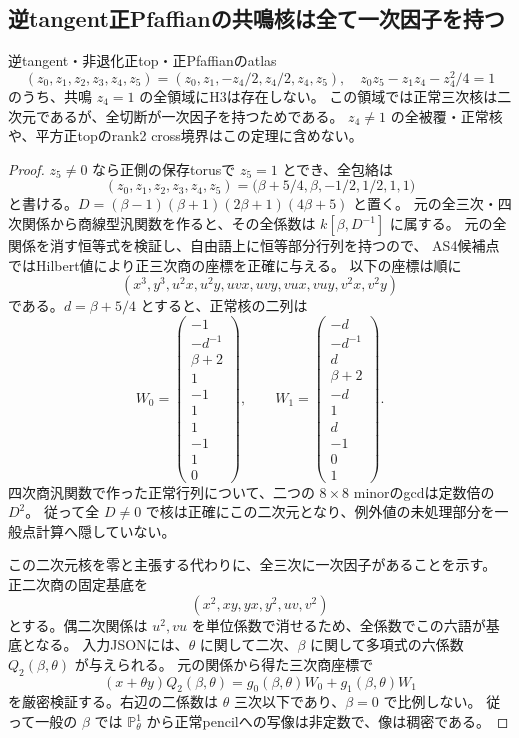 \subsection{逆tangent正Pfaffianの共鳴核は全て一次因子を持つ}
\begin{theorem}\label{thm:h3-order2-22-reverse-resonant-empty}
逆tangent・非退化正top・正Pfaffianのatlas
\[
 (z_0,z_1,z_2,z_3,z_4,z_5)
 =(z_0,z_1,-z_4/2,z_4/2,z_4,z_5),\quad
 z_0z_5-z_1z_4-z_4^2/4=1
\]
のうち、共鳴 $z_4=1$ の全領域にH3は存在しない。
この領域では正常三次核は二次元であるが、全切断が一次因子を持つためである。
$z_4\ne1$ の全被覆・正常核や、平方正topのrank2 cross境界はこの定理に含めない。
\end{theorem}
\begin{proof}
$z_5\ne0$ なら正側の保存torusで $z_5=1$ とでき、全包絡は
\[
 (z_0,z_1,z_2,z_3,z_4,z_5)
 =\bigl(\beta+5/4,\beta,-1/2,1/2,1,1\bigr)
\]
と書ける。$D=(\beta-1)(\beta+1)(2\beta+1)(4\beta+5)$ と置く。
元の全三次・四次関係から商線型汎関数を作ると、その全係数は $k[\beta,D^{-1}]$ に属する。
元の全関係を消す恒等式を検証し、自由語上に恒等部分行列を持つので、
AS4候補点ではHilbert値により正三次商の座標を正確に与える。
以下の座標は順に
\[
 (x^3,y^3,u^2x,u^2y,uvx,uvy,vux,vuy,v^2x,v^2y)
\]
である。$d=\beta+5/4$ とすると、正常核の二列は
\[
 W_0=\begin{pmatrix}-1\\-d^{-1}\\\beta+2\\1\\-1\\1\\1\\-1\\1\\0\end{pmatrix},\qquad
 W_1=\begin{pmatrix}-d\\-d^{-1}\\d\\\beta+2\\-d\\1\\d\\-1\\0\\1\end{pmatrix}.
\]
四次商汎関数で作った正常行列について、二つの $8\times8$ minorのgcdは定数倍の $D^2$。
従って全 $D\ne0$ で核は正確にこの二次元となり、例外値の未処理部分を一般点計算へ隠していない。

この二次元核を零と主張する代わりに、全三次に一次因子があることを示す。
正二次商の固定基底を
\[
 (x^2,xy,yx,y^2,uv,v^2)
\]
とする。偶二次関係は $u^2,vu$ を単位係数で消せるため、全係数でこの六語が基底となる。
入力JSONには、$\theta$ に関して二次、$\beta$ に関して多項式の六係数 $Q_2(\beta,\theta)$ が与えられる。
元の関係から得た三次商座標で
\[
 (x+\theta y)Q_2(\beta,\theta)
 =g_0(\beta,\theta)W_0+g_1(\beta,\theta)W_1
\]
を厳密検証する。右辺の二係数は $\theta$ 三次以下であり、$\beta=0$ で比例しない。
従って一般の $\beta$ では $\mathbb P^1_{\theta}$ から正常pencilへの写像は非定数で、像は稠密である。


\end{proof}
